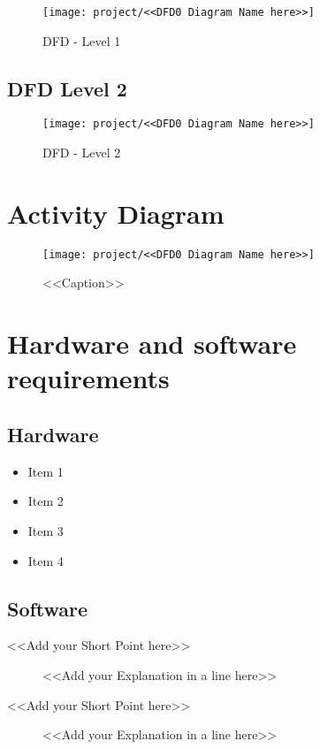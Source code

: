 \begin{figure}[H]
\centering
\texttt{[image: project/<<DFD0 Diagram Name here>>]}
\caption{DFD - Level 1}
\label{fig:dfd1}
\end{figure}

\subsection{DFD Level 2}

\begin{figure}[H]
\centering
\texttt{[image: project/<<DFD0 Diagram Name here>>]}
\caption{DFD - Level 2}
\label{fig:dfd2}
\end{figure}

\section{Activity Diagram}

\begin{figure}[H]
\centering
\texttt{[image: project/<<DFD0 Diagram Name here>>]}
\caption{<<Caption>>}
\label{<<Label>>}
\end{figure}


\section{Hardware and software requirements}
\subsection{Hardware}

\begin{itemize}
\item{Item 1}
\item{Item 2}
\item{Item 3}
\item{Item 4}
\end{itemize}
\subsection{Software}

\begin{description}
\item[<<Add your Short Point here>>] <<Add your Explanation in a line here>>
\item[<<Add your Short Point here>>] <<Add your Explanation in a line here>>
\end{description}

